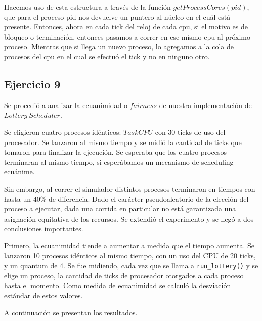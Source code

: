 \documentclass[11pt, a4paper, twoside]{article}
\begin{document}
Hacemos uso de esta estructura a través de la función $getProcessCores(pid)$, que para 
el proceso pid nos devuelve un puntero al núcleo en el cuál está presente. Entonces, ahora
en cada tick del reloj de cada cpu, si el motivo es de bloqueo o terminación, entonces pasamos a correr en ese mismo
cpu al próximo proceso. Mientras que si llega un nuevo proceso, lo agregamos a la cola de procesos del cpu
en el cual se efectuó el tick y no en ninguno otro. 

\clearpage
\subsection{Ejercicio 9}

Se procedió a analizar la ecuanimidad o $fairness$ de nuestra implementación de $Lottery\ Scheduler$.

Se eligieron cuatro procesos idénticos: $TaskCPU$ con 30 ticks de uso del procesador. Se lanzaron al mismo tiempo y se midió la cantidad de ticks que tomaron para finalizar la ejecución. Se esperaba que los cuatro procesos terminaran al mismo tiempo, si esperábamos un mecanismo de scheduling ecuánime.

Sin embargo, al correr el simulador distintos procesos terminaron en tiempos con hasta un 40\% de diferencia. Dado el carácter pseudoaleatorio de la elección del proceso a ejecutar, dada una corrida en particular no está garantizada una asignación equitativa de los recursos. Se extendió el experimento y se llegó a dos conclusiones importantes.

Primero, la ecuanimidad tiende a aumentar a medida que el tiempo aumenta. Se lanzaron 10 procesos idénticos al mismo tiempo, con un uso del CPU de 20 ticks, y un quantum de 4. Se fue midiendo, cada vez que se llama a \texttt{run\_lottery()} y se elige un proceso, la cantidad de ticks de procesador otorgados a cada proceso hasta el momento. Como medida de ecuanimidad se calculó la desviación estándar de estos valores.

A continuación se presentan los resultados.
\end{document}
